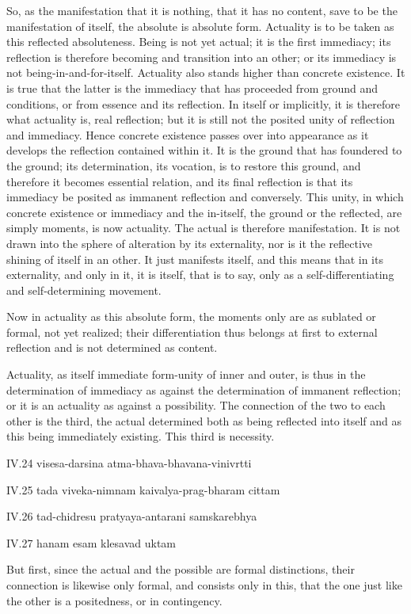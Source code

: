 So, as the manifestation that it is nothing,
that it has no content, save to be the manifestation of itself,
the absolute is absolute form.
Actuality is to be taken as this reflected absoluteness.
Being is not yet actual;
it is the first immediacy;
its reflection is therefore becoming
and transition into an other;
or its immediacy is not being-in-and-for-itself.
Actuality also stands higher than concrete existence.
It is true that the latter is the immediacy
that has proceeded from ground and conditions,
or from essence and its reflection.
In itself or implicitly, it is therefore
what actuality is, real reflection;
but it is still not the posited unity of reflection and immediacy.
Hence concrete existence passes over into appearance
as it develops the reflection contained within it.
It is the ground that has foundered to the ground;
its determination, its vocation, is to restore this ground,
and therefore it becomes essential relation,
and its final reflection is that its
immediacy be posited as immanent reflection and conversely.
This unity, in which concrete existence
or immediacy and the in-itself,
the ground or the reflected, are simply moments,
is now actuality.
The actual is therefore manifestation.
It is not drawn into the sphere of alteration by its externality,
nor is it the reflective shining of itself in an other.
It just manifests itself, and this means that in its externality,
and only in it, it is itself, that is to say,
only as a self-differentiating and self-determining movement.

Now in actuality as this absolute form,
the moments only are as sublated or formal, not yet realized;
their differentiation thus belongs at first to external reflection
and is not determined as content.

Actuality, as itself immediate form-unity of inner and outer,
is thus in the determination of immediacy
as against the determination of immanent reflection;
or it is an actuality as against a possibility.
The connection of the two to each other is the third,
the actual determined both as being reflected into itself
and as this being immediately existing.
This third is necessity.

IV.24
visesa-darsina atma-bhava-bhavana-vinivrtti

IV.25
tada viveka-nimnam kaivalya-prag-bharam cittam

IV.26
tad-chidresu pratyaya-antarani samskarebhya

IV.27
hanam esam klesavad uktam

But first, since the actual and the possible are formal distinctions,
their connection is likewise only formal, and consists only in this,
that the one just like the other is a positedness, or in contingency.

